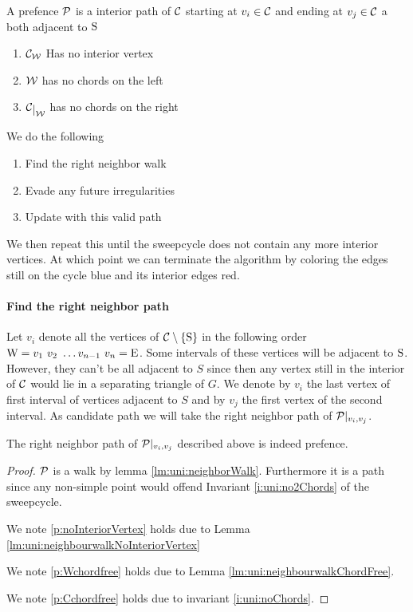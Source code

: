   \begin{defi}[Prefence]
  A prefence $\P$ is a interior path of $\C$ starting at $v_i \in \C$ and ending at $v_j \in \C$ a both adjacent to $\pS$
  \begin{enumerate}
    \itemsep=-4pt
    \renewcommand*{\labelenumi}{(P\arabic{enumi})}%
    \renewcommand*{\theenumi}{(P\arabic{enumi})}%

    \item  $\C_\W$ Has no interior vertex
    \label{p:noInteriorVertex}
    \item  $\W$ has no chords on the left     \label{p:Wchordfree}
    \item  $\restC{\W}$ has no chords on the right     \label{p:Cchordfree}
  \end{enumerate}
  \end{defi}

  We do the following
  \begin{enumerate}
    \itemsep=-4pt
    \item Find the right neighbor walk
    \item Evade any future irregularities
    \item Update with this valid path
  \end{enumerate}

  We then repeat this until the sweepcycle does not contain any more interior vertices. At which point we can terminate the algorithm by coloring the edges still on the cycle blue and its interior edges red.



  \paragraph{Find the right neighbor path}
    Let $v_i$ denote all the vertices of $\cpath$ in the following order $\pW =  v_1 \  v_2 \  \ldots v_{n-1} \  v_n = \pE$.
    Some intervals of these vertices will be adjacent to $\pS$. However, they can't be all adjacent to $S$ since then any vertex still in the interior of $\C$ would lie in a separating triangle of $G$. We denote by $v_i$ the last vertex of first interval of vertices adjacent to $S$ and by $v_j$ the first vertex of the second interval.
    As candidate path we will take the right neighbor path of $\P|_{v_i, v_j}$.

    \begin{lemma}
      \label{lm:uni:isPrefence}
      The right neighbor path of $\P|_{v_i, v_j}$ described above is indeed prefence.
    \end{lemma}
    \begin{proof}
    $\P$ is a walk by lemma \ref{lm:uni:neighborWalk}. Furthermore it is a path since any non-simple point would offend Invariant \ref{i:uni:no2Chords} of the sweepcycle.


    We note \ref{p:noInteriorVertex} holds due to Lemma \ref{lm:uni:neighbourwalkNoInteriorVertex}

    We note \ref{p:Wchordfree} holds due to Lemma \ref{lm:uni:neighbourwalkChordFree}.

    We note \ref{p:Cchordfree} holds due to invariant \ref{i:uni:noChords}.
    \end{proof}

